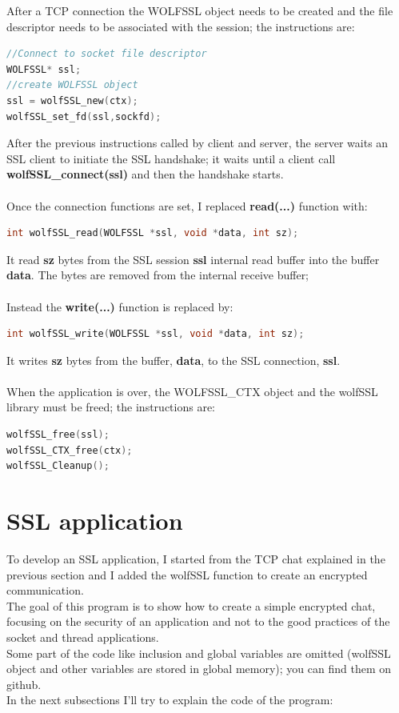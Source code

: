 \documentclass[a4paper,12pt]{report}
\begin{document}
After a TCP connection the WOLFSSL object needs to be created and the file descriptor needs to be associated with the session; the instructions are:
\begin{lstlisting}[language=c]
//Connect to socket file descriptor
WOLFSSL* ssl;
//create WOLFSSL object
ssl = wolfSSL_new(ctx);
wolfSSL_set_fd(ssl,sockfd);
\end{lstlisting}
After the previous instructions called by client and server, the server waits an SSL client to initiate the SSL handshake; it waits until a client call \textbf{wolfSSL\_connect(ssl)} and then the handshake starts.
\\\\Once the connection functions are set, I replaced \textbf{read(...)} function with: 
\begin{lstlisting}[language=c]
int wolfSSL_read(WOLFSSL *ssl, void *data, int sz);
\end{lstlisting}
It read \textbf{sz} bytes from the SSL session \textbf{ssl} internal read buffer into the buffer \textbf{data}. The bytes are removed from the internal receive buffer;
\\\\Instead the \textbf{write(...)} function is replaced by:
\begin{lstlisting}[language=c]
int wolfSSL_write(WOLFSSL *ssl, void *data, int sz);
\end{lstlisting}
It writes \textbf{sz} bytes from the buffer, \textbf{data}, to the SSL connection, \textbf{ssl}.
\\\\When the application is over, the WOLFSSL\_CTX object and the wolfSSL library must be freed; the instructions are:
\begin{lstlisting}[language=c]
wolfSSL_free(ssl);
wolfSSL_CTX_free(ctx);
wolfSSL_Cleanup();
\end{lstlisting}

\pagebreak
\section{SSL application}
To develop an SSL application, I started from the TCP chat explained in the previous section and I added the wolfSSL function to create an encrypted communication.
\\The goal of this program is to show how to create a simple encrypted chat, focusing on the security of an application and not to the good practices of the socket and thread applications.
\\Some part of the code like inclusion and global variables are omitted (wolfSSL object and other variables are stored in global memory); you can find them on github.
\\In the next subsections I'll try to explain the code of the program:
\end{document}
